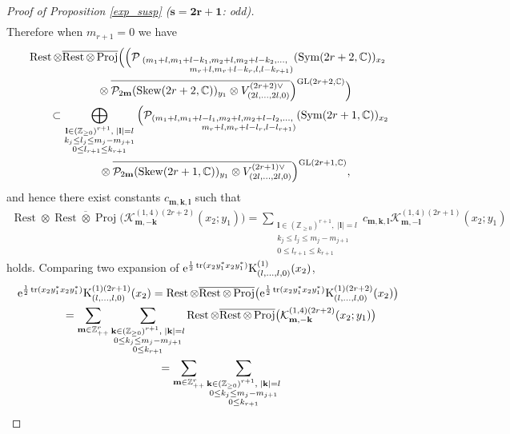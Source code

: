 \documentclass[pdftex]{sigma}
\numberwithin{equation}{section}
\newcommand{\bk}{\mathbf{k}}
\newcommand{\bl}{\mathbf{l}}
\newcommand{\bm}{\mathbf{m}}
\newcommand{\BZ}{\mathbb{Z}}
\newcommand{\BC}{\mathbb{C}}
\newcommand{\cK}{\mathcal{K}}
\newcommand{\cP}{\mathcal{P}}
\newcommand{\rK}{\mathrm{K}}
\newcommand{\tr}{\operatorname{tr}}
\newcommand{\Proj}{\operatorname{Proj}}
\newcommand{\Sym}{\operatorname{Sym}}
\newcommand{\Skew}{\operatorname{Skew}}
\newcommand{\Rest}{\operatorname{Rest}}
\begin{document}
\begin{proof}[Proof of Proposition \ref{exp_susp} ($\boldsymbol{s=2r+1}$: odd)]
\begin{gather*}
\end{gather*}
Therefore when $m_{r+1}=0$ we have
\begin{gather*}
 \Rest\otimes\overline{\Rest\otimes\Proj}\Big(\Big(
\cP_{\substack{(m_1+l,m_1+l-k_1,m_2+l,m_2+l-k_2,\ldots,\;\\\hspace{45pt} m_r+l,m_r+l-k_r,l,l-k_{r+1})}}(\Sym(2r+2,\BC))_{x_2}\\
\qquad\quad {} \otimes\overline{\cP_{2\bm}(\Skew(2r+2,\BC))_{y_1}
\otimes V_{(2l,\ldots,2l,0)}^{(2r+2)\vee}}\Big)^{{\rm GL}(2r+2,\BC)}\Big)\\
\qquad{} \subset\bigoplus_{\substack{\bl\in(\BZ_{\ge 0})^{r+1},\; |\bl|=l\\ k_j\le l_j\le m_j-m_{j+1}\\ 0\le l_{r+1}\le k_{r+1}}}
\Big(\cP_{\substack{(m_1+l,m_1+l-l_1,m_2+l,m_2+l-l_2,\ldots,\;\\\hspace{45pt} m_r+l,m_r+l-l_r,l-l_{r+1})}}(\Sym(2r+1,\BC))_{x_2}\\
\qquad\quad{} \otimes\overline{\cP_{2\bm}(\Skew(2r+1,\BC))_{y_1}
\otimes V_{(2l,\ldots,2l,0)}^{(2r+1)\vee}}\Big)^{{\rm GL}(2r+1,\BC)},
\end{gather*}
and hence there exist constants $c_{\bm,\bk,\bl}$ such that
\begin{gather*} \Rest\otimes\overline{\Rest\otimes\Proj} \big(\cK_{\bm,-\bk}^{(1,4)(2r+2)}(x_2;y_1)\big)
=\sum_{\substack{\bl\in(\BZ_{\ge 0})^{r+1},\; |\bl|=l\\ k_j\le l_j\le m_j-m_{j+1}\\ 0\le l_{r+1}\le k_{r+1}}}
c_{\bm,\bk,\bl}\cK_{\bm,-\bl}^{(1,4)(2r+1)}(x_2;y_1) \end{gather*}
holds. Comparing two expansion of ${\rm e}^{\frac{1}{2}\tr(x_2y_1^*x_2y_1^*)}\rK_{(l,\ldots,l,0)}^{(1)}(x_2)$,
\begin{gather*}
 {\rm e}^{\frac{1}{2}\tr(x_2y_1^*x_2y_1^*)}\rK_{(l,\ldots,l,0)}^{(1)(2r+1)}(x_2)
=\Rest\otimes\overline{\Rest\otimes\Proj}\big({\rm e}^{\frac{1}{2}\tr(x_2y_1^*x_2y_1^*)}\rK_{(l,\ldots,l,0)}^{(1)(2r+2)}(x_2)\big)\\
\qquad{}=\sum_{\bm\in\BZ_{++}^r}\sum_{\substack{\bk\in(\BZ_{\ge 0})^{r+1},\; |\bk|=l\\ 0\le k_j\le m_j-m_{j+1}\\ 0\le k_{r+1}}}
\Rest\otimes\overline{\Rest\otimes\Proj}\big(\cK_{\bm,-\bk}^{(1,4)(2r+2)}(x_2;y_1)\big) \\
\qquad{} =\sum_{\bm\in\BZ_{++}^r}\sum_{\substack{\bk\in(\BZ_{\ge 0})^{r+1},\; |\bk|=l\\ 0\le k_j\le m_j-m_{j+1}\\ 0\le k_{r+1}}}

\end{gather*}
\end{proof}
\end{document}
